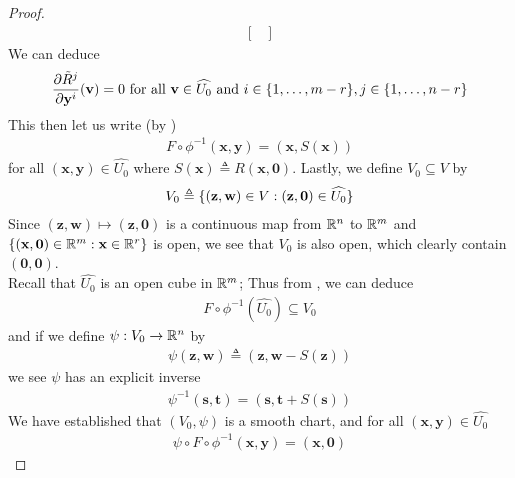 \documentclass{report}
\begin{document}
\begin{proof}
\begin{align*}
\begin{bmatrix}
 \end{bmatrix}
\end{align*}
We can deduce 
\begin{align*}
\frac{\partial \tilde{R}^j }{\partial \textbf{y}^i}(\textbf{v})=0\text{ for all }\textbf{v}\in \widehat{U_0}\text{ and }i \in \{ 1,\dots ,m-r \},j \in \{ 1,\dots ,n-r \}
\end{align*}
This then let us write (by ) 
\begin{align}
\label{Foc}
F\circ \phi^{-1}(\textbf{x},\textbf{y})=(\textbf{x},S(\textbf{x}))
\end{align}
 for all $(\textbf{x},\textbf{y})\in \widehat{U_0}$ where $S(\textbf{x})\triangleq R(\textbf{x},\textbf{0})$. Lastly, we define $V_0\subseteq V$ by 
\begin{align*}
V_0 \triangleq \{ (\textbf{z},\textbf{w})\in V: (\textbf{z},\textbf{0})\in \widehat{U_0} \} 
\end{align*}
Since $(\textbf{z},\textbf{w})\mapsto  (\textbf{z},\textbf{0})$ is a continuous map from $\mathbb{R}^n$ to  $\mathbb{R}^m$ and  $\{ (\textbf{x},\textbf{0})\in\mathbb{R}^m:\textbf{x}\in\mathbb{R}^r \}$ is open, we see that $V_0$ is also open, which clearly contain  $(\textbf{0},\textbf{0})$.\\

Recall that $\widehat{U_0}$ is an open cube in $\mathbb{R}^m$; Thus from , we can deduce
 \begin{align*}
F\circ \phi^{-1}(\widehat{U_0} ) \subseteq V_0
\end{align*}
and if we define $\psi:V_0\rightarrow \mathbb{R}^n$ by 
\begin{align*}
\psi (\textbf{z},\textbf{w})\triangleq (\textbf{z},\textbf{w}-S(\textbf{z}))
\end{align*}
we see $\psi$ has an explicit inverse
\begin{align*}
\psi^{-1}(\textbf{s},\textbf{t})= (\textbf{s},\textbf{t}+ S(\textbf{s}))
\end{align*}
We have established that $(V_0,\psi)$ is a smooth chart, and for all $(\textbf{x},\textbf{y})\in \widehat{U_0}$
\begin{align*}
\psi \circ F \circ \phi^{-1} (\textbf{x},\textbf{y})= (\textbf{x},\textbf{0})
\end{align*}
\end{proof}
\end{document}
